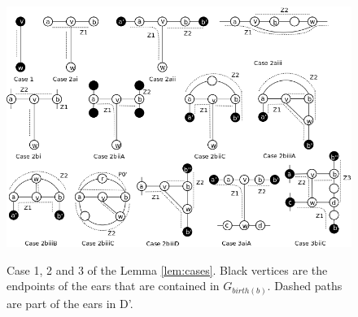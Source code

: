\begin{figure}
    \centering
    \includegraphics[scale=0.3]{algoCases.png} \\
    \caption{Case 1, 2 and 3 of the Lemma \ref{lem:cases}. Black vertices are the endpoints of the ears that are contained in $G_{birth(b)}$. Dashed paths are part of the ears in D'.}
    \label{fig:algoCases}
\end{figure}

